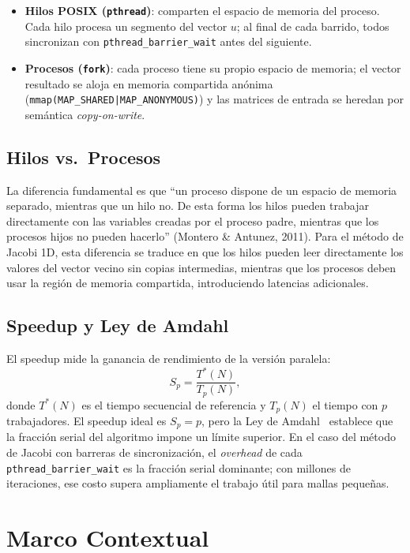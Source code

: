 \documentclass{article}
\begin{document}
\begin{itemize}
  \item \textbf{Hilos POSIX (\texttt{pthread})}: comparten el espacio de memoria
    del proceso.  Cada hilo procesa un segmento del vector $u$; al final de cada
    barrido, todos sincronizan con \texttt{pthread\_barrier\_wait} antes del
    siguiente.
  \item \textbf{Procesos (\texttt{fork})}: cada proceso tiene su propio espacio
    de memoria; el vector resultado se aloja en memoria compartida anónima
    (\texttt{mmap(MAP\_SHARED|MAP\_ANONYMOUS)}) y las matrices de entrada se
    heredan por semántica \emph{copy-on-write}.
\end{itemize}

\subsection{Hilos vs.\ Procesos}

La diferencia fundamental es que ``un proceso dispone de un espacio de memoria
separado, mientras que un hilo no. De esta forma los hilos pueden trabajar
directamente con las variables creadas por el proceso padre, mientras que los
procesos hijos no pueden hacerlo'' (Montero \& Antunez, 2011).  Para el método
de Jacobi 1D, esta diferencia se traduce en que los hilos pueden leer
directamente los valores del vector vecino sin copias intermedias, mientras que
los procesos deben usar la región de memoria compartida, introduciendo latencias
adicionales.

\subsection{Speedup y Ley de Amdahl}

El speedup mide la ganancia de rendimiento de la versión paralela:
\[
  S_p = \frac{T^*(N)}{T_p(N)},
\]
donde $T^*(N)$ es el tiempo secuencial de referencia y $T_p(N)$ el tiempo
con $p$ trabajadores.  El speedup ideal es $S_p = p$, pero la Ley de
Amdahl~\cite{amdahl} establece que la fracción serial del algoritmo impone un
límite superior.  En el caso del método de Jacobi con barreras de
sincronización, el \emph{overhead} de cada \texttt{pthread\_barrier\_wait} es la
fracción serial dominante; con millones de iteraciones, ese costo supera
ampliamente el trabajo útil para mallas pequeñas.

\section{Marco Contextual}
\end{document}

